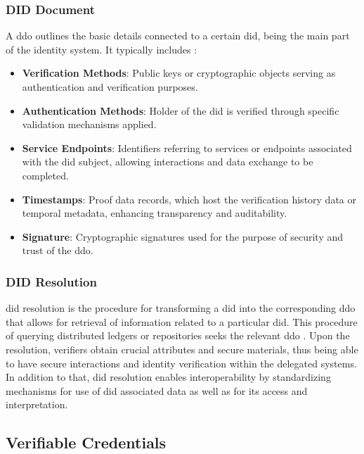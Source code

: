 \subsubsection{DID Document}

A \gls{ddo} outlines the basic details connected to a certain \gls{did}, being the main part of the identity system. It typically includes \cite{9869618}:

\begin{itemize}
  \item \textbf{Verification Methods}: Public keys or cryptographic objects serving as authentication and verification purposes.
  \item \textbf{Authentication Methods}: Holder of the \gls{did} is verified through specific validation mechanisms applied.
  \item \textbf{Service Endpoints}: Identifiers referring to services or endpoints associated with the \gls{did} subject, allowing interactions and data exchange to be completed.
  \item \textbf{Timestamps}: Proof data records, which host the verification history data or temporal metadata, enhancing transparency and auditability.
  \item \textbf{Signature}: Cryptographic signatures used for the purpose of security and trust of the \gls{ddo}.
\end{itemize}

\subsubsection{DID Resolution}

\gls{did} resolution is the procedure for transforming a \gls{did} into the corresponding \gls{ddo} that allows for retrieval of information related to a particular \gls{did}. This 
procedure of querying distributed ledgers or repositories seeks the relevant \gls{ddo} \cite{w3didcore}. Upon the resolution, verifiers obtain crucial attributes and secure materials, 
thus being able to have secure interactions and identity verification within the delegated systems. In addition to that, \gls{did} resolution enables interoperability by 
standardizing mechanisms for use of \gls{did} associated data as well as for its access and interpretation.

\subsection{Verifiable Credentials}

